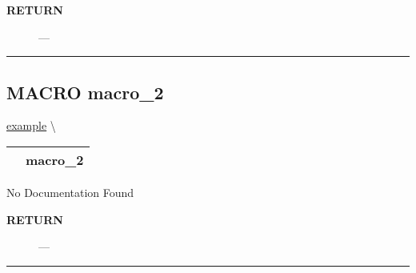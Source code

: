 \par
\begin{description}
\item [\colorbox{tagtype}{\color{white} \textbf{\textsf{RETURN}}}] \textbf{} --- 
\end{description}




\rule{\linewidth}{0.5pt}
\subsection*{\textsf{\colorbox{headtoc}{\color{white} MACRO}
macro\_2}}

\hypertarget{ecldoc:example.macro_2}{}
\hspace{0pt} \hyperlink{ecldoc:example}{example} \textbackslash 

{\renewcommand{\arraystretch}{1.5}
\begin{tabularx}{\textwidth}{|>{\raggedright\arraybackslash}l|X|}
\hline
\hspace{0pt}\mytexttt{\color{red} } & \textbf{macro\_2} \\
\hline
\end{tabularx}
}

\par





No Documentation Found








\par
\begin{description}
\item [\colorbox{tagtype}{\color{white} \textbf{\textsf{RETURN}}}] \textbf{} --- 
\end{description}




\rule{\linewidth}{0.5pt}



